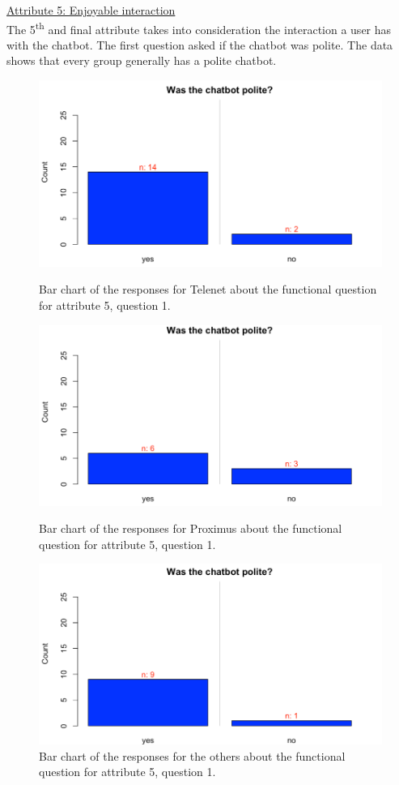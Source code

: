 \break
\ul{Attribute 5: Enjoyable interaction}\\
\break
The 5\textsuperscript{th} and final attribute takes into consideration the interaction a user has with the chatbot. The first question asked if the chatbot was polite. The data shows that every group generally has a polite chatbot.\\
\begin{figure}[!htb]
	\includegraphics[width=\linewidth]{../LaTeX/Figures/Comparative/Q5T.png}
	\caption{Bar chart of the responses for Telenet about the functional question for attribute 5, question 1.}\label{fig:Q5T}
	\endminipage\hfill
	\includegraphics[width=\linewidth]{../LaTeX/Figures/Comparative/Q5P.png}
	\caption{Bar chart of the responses for Proximus about the functional question for attribute 5, question 1.}\label{fig:Q5P}
	\endminipage\hfill
	\includegraphics[width=\linewidth]{../LaTeX/Figures/Comparative/Q5O.png}
	\caption{Bar chart of the responses for the others about the functional question for attribute 5, question 1.}\label{fig:Q5O}
	\endminipage\hfill
\end{figure}
